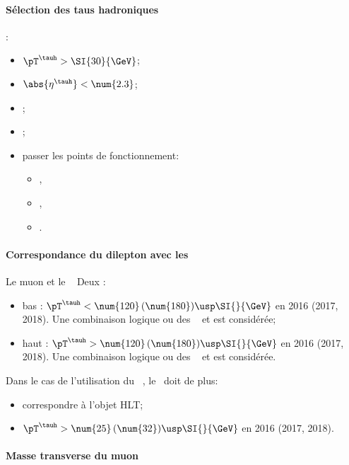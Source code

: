 \paragraph{Sélection des taus hadroniques}
:
\begin{itemize}
    \item $\pT^{\tauh} > \SI{30}{\GeV}$;
    \item $\abs{\eta^{\tauh}} < \num{2.3}$;
    \item \TauHdz;
    \item \NewDecayModeFinding;
    \item passer les points de fonctionnement:
        \begin{itemize}
            \item {},
            \item {},
            \item {}.
        \end{itemize}
\end{itemize}
\paragraph{Correspondance du dilepton avec les \HLTpaths}
Le muon et le \tauh\ \FromPairMatchToHLTObjects{}
Deux \HLTregionsDefined:
\begin{itemize}
    \item bas \pT: $\pT^{\tauh} < \num{120} \, (\num{180}) \usp \SI{}{\GeV}$ en 2016 (2017, 2018).
        Une combinaison logique \og ou \fg{} des \HLTpaths\ \HLTSingleMu{} et \HLTMuTauCross{} est considérée;
    \item haut \pT: $\pT^{\tauh} > \num{120} \, (\num{180}) \usp \SI{}{\GeV}$ en 2016 (2017, 2018).
        Une combinaison logique \og ou \fg{} des \HLTpaths\ \HLTSingleMu{} et \HLTSingleTau{} est considérée.
\end{itemize}
Dans le cas de l'utilisation du \HLTpath\ \HLTMuTauCross{}, le \tauh\ doit de plus:
\begin{itemize}
    \item correspondre à l'objet HLT;
    \item $\pT^{\tauh} > \num{25} \, (\num{32}) \usp \SI{}{\GeV}$ en 2016 (2017, 2018).
\end{itemize}
\paragraph{Masse transverse du muon}
